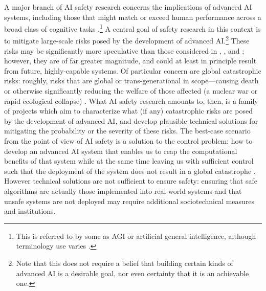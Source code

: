 A major branch of AI safety research concerns the implications of advanced AI systems, including those that might match or exceed human performance across a broad class of cognitive tasks \citep{everitt2018agi}.\footnote{This is referred to by some as AGI or artificial general intelligence, although terminology use varies \citep[\eg see][]{karnofsky2016potential}.} A central goal of safety research in this context is to mitigate large-scale risks posed by the development of advanced AI.\footnote{Note that this does not require a belief that building certain kinds of advanced AI is a desirable goal, nor even certainty that it is an achievable one.} These risks may be significantly more speculative than those considered in , , and ; however, they are of far greater magnitude, and could at least in principle result from future, highly-capable systems. Of particular concern are global catastrophic risks: roughly, risks that are global or trans-generational in scope—causing death or otherwise significantly reducing the welfare of those affected (\eg a nuclear war or rapid ecological collapse) \citep{bostrom2011global}. What AI safety research amounts to, then, is a family of projects which aim to characterize what (if any) catastrophic risks are posed by the development of advanced AI, and develop plausible technical solutions for mitigating the probability or the severity of these risks. The best-case scenario from the point of view of AI safety is a solution to the control problem: how to develop an advanced AI system that enables us to reap the computational benefits of that system while at the same time leaving us with sufficient control such that the deployment of the system does not result in a global catastrophe \citep{bostrom2011global}. However technical solutions are not sufficient to ensure safety: ensuring that safe algorithms are actually those implemented into real-world systems and that unsafe systems are not deployed may require additional sociotechnical measures and institutions. 

